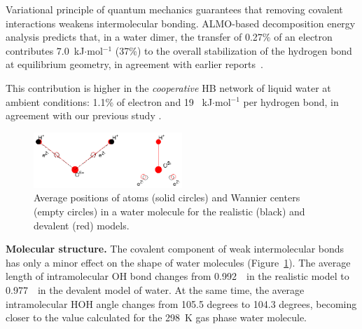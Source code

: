 \documentclass[aps,prl,reprint,amsmath,amssymb]{revtex4-1}
\begin{document}
Variational principle of quantum mechanics guarantees that removing covalent interactions weakens intermolecular bonding. 
ALMO-based decomposition energy analysis predicts that, in a water dimer, the transfer of 0.27\% of an electron contributes  7.0~kJ$\cdot$mol$^{-1}$ (37\%) to the overall stabilization of the hydrogen bond at equilibrium geometry, in agreement with earlier reports~\cite{stevens1987frozen,chen1996energy,piquemal2005csov,khaliullin2009electron}. 

This contribution is higher in the \emph{cooperative} HB network of liquid water at ambient conditions: 1.1\% of electron and 19 ~kJ$\cdot$mol$^{-1}$ per hydrogen bond, in agreement with our previous study \cite{kuhne2014nature}.

\begin{figure}
\includegraphics[width=0.5\textwidth]{acoord}
\caption{Average positions of atoms (solid circles) and Wannier centers (empty circles) in a water molecule for the realistic (black) and devalent (red) models. 
} \label{Fig:acoord}
\end{figure}

\textbf{Molecular structure.} The covalent component of weak intermolecular bonds has only a minor effect on the shape of water molecules (Figure~\ref{Fig:acoord}). 
The average length of intramolecular OH bond changes from 0.992~\Ang\ in the realistic model to 0.977~\Ang\ in the devalent model of water. 
At the same time, the average intramolecular HOH angle changes from 105.5 degrees to 104.3 degrees, becoming closer to the value calculated for the 298~K gas phase water molecule.
\end{document}
